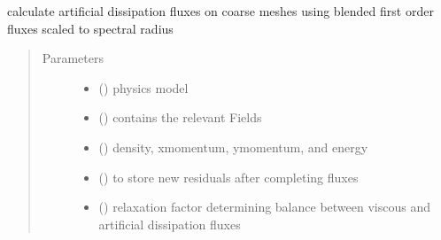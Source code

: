 \documentclass[letterpaper,10pt,english]{sphinxmanual}
\begin{document}
\begin{fulllineitems}
\label{\detokenize{autoapi/dfluxc/index:dfluxc.dfluxc}}
\sphinxAtStartPar
calculate artificial dissipation fluxes on coarse meshes using blended first order
fluxes scaled to spectral radius
\begin{quote}\begin{description}
\item[{Parameters}] \leavevmode\begin{itemize}
\item {} 
\sphinxAtStartPar
{} ({\hyperref[\detokenize{autoapi/NavierStokes/index:NavierStokes.NavierStokes}]{}}) \textendash{} physics model

\item {} 
\sphinxAtStartPar
{} ({\hyperref[\detokenize{autoapi/Workspace/index:Workspace.Workspace}]{}}) \textendash{} contains the relevant Fields

\item {} 
\sphinxAtStartPar
{} ({\hyperref[\detokenize{autoapi/Field/index:Field.Field}]{}}) \textendash{} density, x\sphinxhyphen{}momentum, y\sphinxhyphen{}momentum, and energy

\item {} 
\sphinxAtStartPar
{} ({\hyperref[\detokenize{autoapi/Field/index:Field.Field}]{}}) \textendash{} to store new residuals after completing fluxes

\item {} 
\sphinxAtStartPar
{} () \textendash{} relaxation factor determining balance between viscous and artificial dissipation fluxes

\end{itemize}

\end{description}\end{quote}

\end{fulllineitems}
\end{document}
